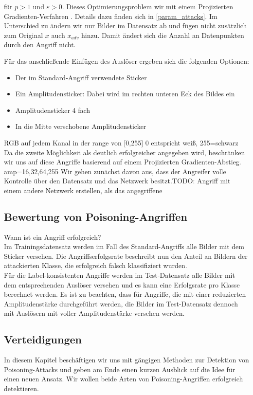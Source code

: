 \documentclass[twoside, 11pt,a4paper]{article}
\numberwithin{equation}{section}
\begin{document}
	für $p >1 $ und $\varepsilon > 0$. Dieses Optimierungsproblem wir mit einem Projizierten Gradienten-Verfahren \cite{madry2017towards}. Details dazu finden sich in \autoref{param_attacks}. Im Unterschied zu \cite{labelconsistent} ändern wir nur Bilder im Datensatz ab und fügen nicht zusätzlich zum Original $x$ auch $x_{adv}$ hinzu. Damit ändert sich die Anzahl an Datenpunkten durch den Angriff nicht.
	
	Für das anschließende Einfügen des Auslöser ergeben sich die folgenden Optionen:
	\begin{itemize}
		\item Der im Standard-Angriff verwendete Sticker
		\item Ein Amplitudensticker: Dabei wird im rechten unteren Eck des Bildes ein 
		\item Amplitudensticker 4 fach
		\item In die Mitte verschobene Amplitudensticker
	\end{itemize}
	RGB auf jedem Kanal in der range von [0,255]
	0 entspricht weiß, 255=schwarz
	Da die zweite Möglichkeit als deutlich erfolgreicher angegeben wird, beschränken wir uns auf diese Angriffe basierend auf einem Projizierten Gradienten-Abstieg.
	amp=16,32,64,255
	Wir gehen zunächst davon aus, dass der Angreifer volle Kontrolle über den Datensatz und das Netzwerk besitzt.TODO: Angriff mit einem andere Netzwerk erstellen, als das angegriffene
	
	\subsection{Bewertung von Poisoning-Angriffen}
	
	Wann ist ein Angriff erfolgreich?\\
	Im Trainingsdatensatz werden im Fall des Standard-Angriffs alle Bilder mit dem Sticker versehen. Die Angriffserfolgsrate beschreibt nun den Anteil an Bildern der attackierten Klasse, die erfolgreich falsch klassifiziert wurden.\\
	
	Für die Label-konsistenten Angriffe werden im Test-Datensatz alle Bilder mit dem entsprechenden Auslöser versehen und es kann eine Erfolgsrate pro Klasse berechnet werden. Es ist zu beachten, dass für Angriffe, die mit einer reduzierten Amplitudenstärke durchgeführt werden, die Bilder im Test-Datensatz dennoch mit Auslösern mit voller Amplitudenstärke versehen werden. 
	
	\subsection{Verteidigungen}
	In diesem Kapitel beschäftigen wir uns mit gängigen Methoden zur Detektion von Poisoning-Attacks und geben am Ende einen kurzen Ausblick auf die Idee für einen neuen Ansatz.
	Wir wollen beide Arten von Poisoning-Angriffen erfolgreich detektieren. 
	
\end{document}
